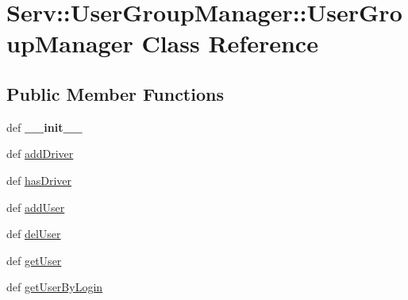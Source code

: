 \hypertarget{class_serv_1_1_user_group_manager_1_1_user_group_manager}{
\section{Serv::UserGroupManager::UserGroupManager Class Reference}
\label{class_serv_1_1_user_group_manager_1_1_user_group_manager}
}
\subsection*{Public Member Functions}
\begin{CompactItemize}
\item 
\hypertarget{class_serv_1_1_user_group_manager_1_1_user_group_manager_f43f9798f1e93dd8425699ecd6de6c87}{
def \textbf{\_\-\_\-init\_\-\_\-}}
\label{class_serv_1_1_user_group_manager_1_1_user_group_manager_f43f9798f1e93dd8425699ecd6de6c87}

\item 
def \hyperlink{class_serv_1_1_user_group_manager_1_1_user_group_manager_ea0f7f8d1d6e4d5efce31f3d0ea35fd9}{addDriver}
\item 
def \hyperlink{class_serv_1_1_user_group_manager_1_1_user_group_manager_39ae7245da0bcda25ce712d1b55f2f29}{hasDriver}
\item 
def \hyperlink{class_serv_1_1_user_group_manager_1_1_user_group_manager_46ee225566738a93c7c036b464a931fb}{addUser}
\item 
def \hyperlink{class_serv_1_1_user_group_manager_1_1_user_group_manager_4b747272c8166d17b9458b3f8c4796f0}{delUser}
\item 
def \hyperlink{class_serv_1_1_user_group_manager_1_1_user_group_manager_94bccb5702d504f5b782ba2379aaaab4}{getUser}
\item 
def \hyperlink{class_serv_1_1_user_group_manager_1_1_user_group_manager_ed20d08470748f78a641e6cc5700b505}{getUserByLogin}
\end{CompactItemize}
